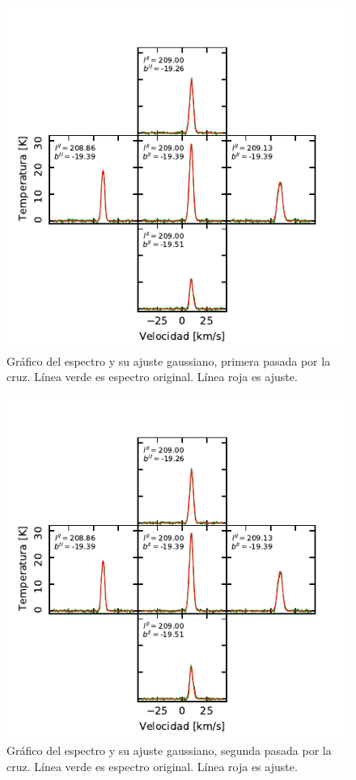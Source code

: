 \begin{figure}[htbp]
	\centering
	\includegraphics{specfit1.pdf}
	\caption{Gráfico del espectro y su ajuste gaussiano, primera pasada por la cruz. Línea verde es espectro original. Línea roja es ajuste.}
	\label{fig:specfit1}
\end{figure}

\begin{figure}[htbp]
	\centering
	\includegraphics{specfit2.pdf}
	\caption{Gráfico del espectro y su ajuste gaussiano, segunda pasada por la cruz. Línea verde es espectro original. Línea roja es ajuste.}
	\label{fig:specfit2}
\end{figure}

